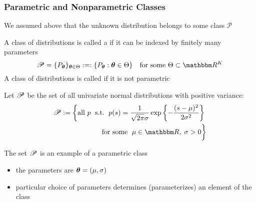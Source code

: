 \begin{frame}\frametitle{Parametric and Nonparametric Classes}
    
    \vspace{2em}
    We assumed above that the unknown distribution belongs to some class $\mathscr{P}$ 
    
    \vspace{.7em}
    A  class of distributions is called a  if it can be indexed by
    finitely many parameters
    \begin{equation*}
        \pP = \{P_{\boldtheta}\}_{\boldtheta \in \Theta} :=:
        \setntn{P_{\boldtheta}}{\boldtheta \in \Theta}
        \quad \text{for some } \Theta \subset \RR^K
    \end{equation*}
    A class of distributions is called
     if it is not parametric
    
\end{frame}

\begin{frame}
    
    \vspace{2em}
    \Eg
    Let $\mathscr P$ be the set of 
    all univariate normal distributions with positive variance:
    \begin{align*}
        \pP := 
        \bigg\{
        \text{all } p \; \st \;
        p(s) = \frac{1}{\sqrt{2 \pi} \sigma}
       \exp \left\{ - \frac{(s - \mu)^2}{2\sigma^2} \right\}
       \; \\ \text{ for some }
       \; \mu \in \RR, \; \sigma > 0
       \bigg\}
    \end{align*}
    
    The set $\mathscr P$ is an example of a parametric class
    
    \begin{itemize}
        \item the parameters
    are ${\boldsymbol \theta} = (\mu, \sigma)$
        \item particular choice of parameters
    determines (parameterizes) an element of the class
    \end{itemize}
    
\end{frame}

